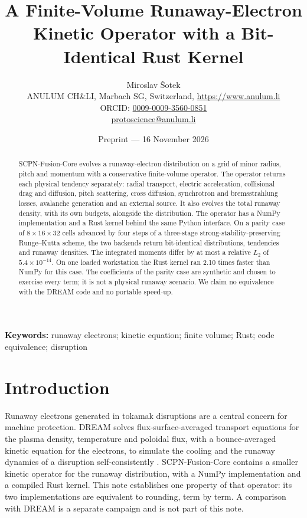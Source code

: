 \documentclass[11pt]{article}
\title{A Finite-Volume Runaway-Electron Kinetic Operator with a Bit-Identical
Rust Kernel}
\author{Miroslav \v{S}otek\\
\small ANULUM CH\&LI, Marbach SG, Switzerland, \url{https://www.anulum.li}\\
\small ORCID: \href{https://orcid.org/0009-0009-3560-0851}{0009-0009-3560-0851}\\
\small \href{mailto:protoscience@anulum.li}{protoscience@anulum.li}}
\date{Preprint --- 16 November 2026}
\begin{document}
\maketitle

\begin{abstract}
SCPN-Fusion-Core evolves a runaway-electron distribution on a grid of minor
radius, pitch and momentum with a conservative finite-volume operator.  The
operator returns each physical tendency separately: radial transport, electric
acceleration, collisional drag and diffusion, pitch scattering, cross
diffusion, synchrotron and bremsstrahlung losses, avalanche generation and an
external source.  It also evolves the total runaway density, with its own
budgets, alongside the distribution.  The operator has a NumPy implementation
and a Rust kernel behind the same Python interface.  On a parity case of
$8 \times 16 \times 32$ cells advanced by four steps of a three-stage
strong-stability-preserving Runge--Kutta scheme, the two backends return
bit-identical distributions, tendencies and runaway densities.  The integrated
moments differ by at most a relative $L_2$ of $5.4 \times 10^{-14}$.  On one
loaded workstation the Rust kernel ran 2.10 times faster than NumPy for this
case.  The coefficients of the parity case are synthetic and chosen to exercise
every term; it is not a physical runaway scenario.  We claim no equivalence
with the DREAM code and no portable speed-up.
\end{abstract}

\noindent\textbf{Keywords:} runaway electrons; kinetic equation; finite volume;
Rust; code equivalence; disruption

\section{Introduction}

Runaway electrons generated in tokamak disruptions are a central concern for
machine protection.  DREAM solves flux-surface-averaged transport equations
for the plasma density, temperature and poloidal flux, with a bounce-averaged
kinetic equation for the electrons, to simulate the cooling and the runaway
dynamics of a disruption self-consistently \citep{Hoppe2021}.  SCPN-Fusion-Core
contains a smaller kinetic operator for the runaway distribution, with a
NumPy implementation and a compiled Rust kernel.  This note establishes one
property of that operator: its two implementations are equivalent to rounding,
term by term.  A comparison with DREAM is a separate campaign and is not part
of this note.
\end{document}
